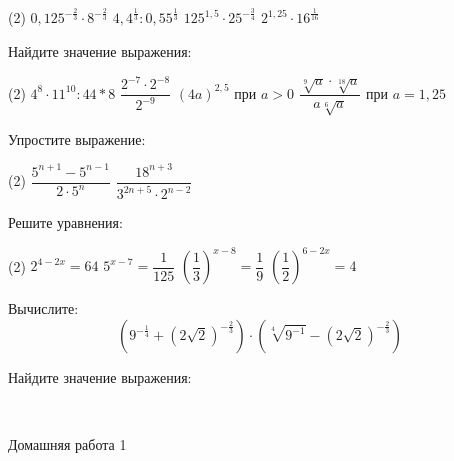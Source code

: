 \begin{class}[number=1]
\begin{listofex}
		\begin{tasks}(2)
			\task \( 0,125^{-\frac{2}{3}}\cdot 8^{-\frac{2}{3}} \)
			\task \( 4,4^{\frac{1}{3}}:0,55^{\frac{1}{3}} \)
			\task \( 125^{1,5}\cdot 25^{-\frac{3}{4}} \)
			\task \( 2^{1,25}\cdot 16^{\frac{1}{16}} \)
		\end{tasks}
		\item Найдите значение выражения:
		\begin{tasks}(2)
			\task \( 4^8 \cdot 11^{10}:44*8 \)
			\task \( \dfrac{2^{-7}\cdot2^{-8}}{2^{-9}} \)
			\task \( (4a)^{2,5} \) при \( a>0 \)
			\task \( \dfrac{\sqrt[9]{a} \cdot \sqrt[18]{a} }{a \sqrt[6]{a}} \) при \(a=1,25\)
		\end{tasks}
		\item Упростите выражение:
		\begin{tasks}(2)
			\task \( \dfrac{5^{n+1}-5^{n-1}}{2\cdot 5^n} \)
			\task \( \dfrac{18^{n+3}}{3^{2n+5} \cdot 2^{n-2}} \)
		\end{tasks}
		\item Решите уравнения: %
		\begin{tasks}(2)
			\task \( 2^{4-2x}=64 \) %
			\task \( 5^{x-7}=\dfrac{1}{125} \) %
			\task \( \left( \dfrac{1}{3} \right)^{x-8} = \dfrac{1}{9}  \) %
			\task \( \left( \dfrac{1}{2} \right)^{6-2x} = 4  \) %
		\end{tasks}
		\item Вычислите: \[ \left( 9^{-\frac{1}{4}}+(2\sqrt{2})^{-\frac{2}{3}} \right) \cdot \left( \sqrt[4]{9^{-1}} - (2\sqrt{2})^{-\frac{2}{3}} \right)  \]
	\end{listofex}
\end{class}

\begin{class}[number=2]
	\begin{listofex}
		\item Найдите значение выражения:
		\begin{tasks}
			\task \(  \)
			\task \(  \)
		\end{tasks}
	\end{listofex}
\end{class}

\begin{homework}[number=1]
	\begin{listofex}
		\item Домашняя работа 1
	\end{listofex}
\end{homework}

